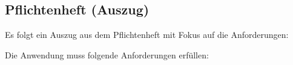 \subsection{Pflichtenheft (Auszug)}
\label{app:Pflichtenheft}
Es folgt ein Auszug aus dem Pflichtenheft mit Fokus auf die Anforderungen:

Die Anwendung muss folgende Anforderungen erfüllen:



%
